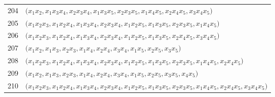 {\begin{longtable}{@{}r>{\raggedright\arraybackslash}p{}@{}}
204 & \(\bigl(x_{1}x_{2},\allowbreak x_{1}x_{3}x_{4},\allowbreak x_{2}x_{3}x_{4},\allowbreak x_{1}x_{3}x_{5},\allowbreak x_{2}x_{3}x_{5},\allowbreak x_{1}x_{4}x_{5},\allowbreak x_{2}x_{4}x_{5},\allowbreak x_{3}x_{4}x_{5}\bigr)\) \\
205 & \(\bigl(x_{1}x_{2}x_{3},\allowbreak x_{1}x_{2}x_{4},\allowbreak x_{1}x_{3}x_{4},\allowbreak x_{2}x_{3}x_{4},\allowbreak x_{1}x_{2}x_{5},\allowbreak x_{1}x_{3}x_{5},\allowbreak x_{2}x_{3}x_{5},\allowbreak x_{1}x_{4}x_{5}\bigr)\) \\
206 & \(\bigl(x_{1}x_{2}x_{3},\allowbreak x_{1}x_{2}x_{4},\allowbreak x_{1}x_{3}x_{4},\allowbreak x_{2}x_{3}x_{4},\allowbreak x_{1}x_{2}x_{5},\allowbreak x_{1}x_{3}x_{5},\allowbreak x_{2}x_{4}x_{5},\allowbreak x_{3}x_{4}x_{5}\bigr)\) \\
207 & \(\bigl(x_{1}x_{2},\allowbreak x_{1}x_{3},\allowbreak x_{2}x_{3},\allowbreak x_{1}x_{4},\allowbreak x_{2}x_{4},\allowbreak x_{3}x_{4},\allowbreak x_{1}x_{5},\allowbreak x_{2}x_{5},\allowbreak x_{3}x_{5}\bigr)\) \\
208 & \(\bigl(x_{1}x_{2}x_{3},\allowbreak x_{1}x_{2}x_{4},\allowbreak x_{1}x_{3}x_{4},\allowbreak x_{2}x_{3}x_{4},\allowbreak x_{1}x_{2}x_{5},\allowbreak x_{1}x_{3}x_{5},\allowbreak x_{2}x_{3}x_{5},\allowbreak x_{1}x_{4}x_{5},\allowbreak x_{2}x_{4}x_{5}\bigr)\) \\
209 & \(\bigl(x_{1}x_{2},\allowbreak x_{1}x_{3},\allowbreak x_{2}x_{3},\allowbreak x_{1}x_{4},\allowbreak x_{2}x_{4},\allowbreak x_{3}x_{4},\allowbreak x_{1}x_{5},\allowbreak x_{2}x_{5},\allowbreak x_{3}x_{5},\allowbreak x_{4}x_{5}\bigr)\) \\
210 & \(\bigl(x_{1}x_{2}x_{3},\allowbreak x_{1}x_{2}x_{4},\allowbreak x_{1}x_{3}x_{4},\allowbreak x_{2}x_{3}x_{4},\allowbreak x_{1}x_{2}x_{5},\allowbreak x_{1}x_{3}x_{5},\allowbreak x_{2}x_{3}x_{5},\allowbreak x_{1}x_{4}x_{5},\allowbreak x_{2}x_{4}x_{5},\allowbreak x_{3}x_{4}x_{5}\bigr)\) \\
\end{longtable}
}
